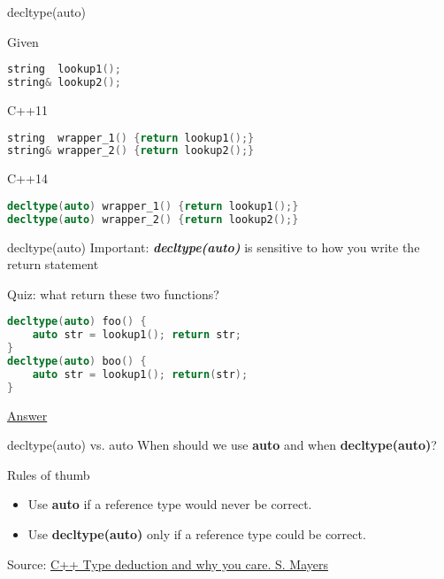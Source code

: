 \documentclass{beamer}
\begin{document}
\begin{frame}[fragile]{decltype(auto)}
\begin{block}{Given}
\begin{lstlisting}[firstnumber=1, label=glabels, xleftmargin=5pt, language=C++] 
string  lookup1();
string& lookup2();
\end{lstlisting}
\end{block}

\begin{block}{C++11}
\begin{lstlisting}[firstnumber=1, label=glabels, xleftmargin=5pt, language=C++] 
string  wrapper_1() {return lookup1();}
string& wrapper_2() {return lookup2();}
\end{lstlisting}
\end{block}

\begin{block}{C++14}
\begin{lstlisting}[firstnumber=1, label=glabels, xleftmargin=5pt, language=C++] 
decltype(auto) wrapper_1() {return lookup1();}
decltype(auto) wrapper_2() {return lookup2();}
\end{lstlisting}
\end{block}
\end{frame}

\begin{frame}[fragile]{decltype(auto)}
Important: \textbf{\textit{decltype(auto)}} is sensitive to how you write the return statement

\begin{block}{Quiz: what return these two functions?}
\begin{lstlisting}[firstnumber=1, label=glabels, xleftmargin=5pt, language=C++] 
decltype(auto) foo() {
    auto str = lookup1(); return str;
}
decltype(auto) boo() {
    auto str = lookup1(); return(str);
}
\end{lstlisting}
\end{block}
\vfill 
\href{https://isocpp.org/wiki/faq/cpp14-language#decltype-auto}{Answer}
\end{frame}

\begin{frame}{decltype(auto) vs. auto}
When should we use \textbf{auto} and when \textbf{decltype(auto)}?

\begin{block}{Rules of thumb}
\begin{itemize}
\item Use \textbf{auto} if a reference type would never be correct.
\item Use \textbf{decltype(auto)} only if a reference type could be correct.
\end{itemize}
\end{block}

\vfill
Source: \href{https://www.aristeia.com/TalkNotes/C++TypeDeductionandWhyYouCareCppCon2014.pdf}{C++ Type deduction and why you care. S. Mayers}
\end{frame}
\end{document}
